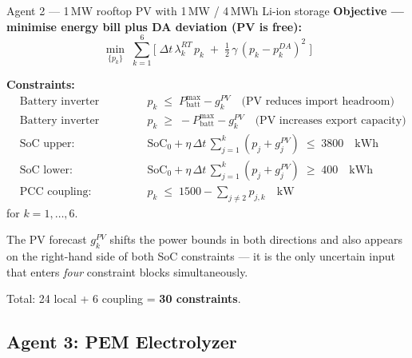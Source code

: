 \documentclass[11pt, letterpaper]{article}
\newcommand{\Dt}{\Delta t}
\begin{document}
\begin{agentbox}{Agent 2 — 1\,MW rooftop PV with 1\,MW / 4\,MWh Li-ion storage}
\textbf{Objective — minimise energy bill plus DA deviation (PV is free):}
\[
\min_{\{p_k\}}\;\sum_{k=1}^{6}\Big[\;\Dt\,\lambda^{RT}_k\,p_k
  \;+\; \tfrac{1}{2}\,\gamma\,(p_k - p^{DA}_k)^2\;\Big]
\]

\textbf{Constraints:}
\begin{align*}
  &\text{Battery inverter upper:} && p_k \;\le\; P^{\max}_{\text{batt}} - g^{PV}_k \quad\text{(PV reduces import headroom)} \\
  &\text{Battery inverter lower:} && p_k \;\ge\; -P^{\max}_{\text{batt}} - g^{PV}_k \quad\text{(PV increases export capacity)} \\
  &\text{SoC upper:}   && \text{SoC}_0 + \eta\,\Dt\,\textstyle\sum_{j=1}^k (p_j + g^{PV}_j) \;\le\; 3800 \quad\text{kWh} \\
  &\text{SoC lower:}   && \text{SoC}_0 + \eta\,\Dt\,\textstyle\sum_{j=1}^k (p_j + g^{PV}_j) \;\ge\; 400  \quad\text{kWh} \\
  &\text{PCC coupling:}&& p_k \;\le\; 1500 - \textstyle\sum_{j\ne 2} p_{j,k} \quad\text{kW}
\end{align*}
for $k = 1,\ldots,6$.

The PV forecast $g^{PV}_k$ shifts the power bounds in both directions and also appears on the right-hand side of both SoC constraints — it is the only uncertain input that enters \emph{four} constraint blocks simultaneously.

Total: 24 local + 6 coupling = \textbf{30 constraints}.

\end{agentbox}

\subsection{Agent 3: PEM Electrolyzer}
\end{document}

